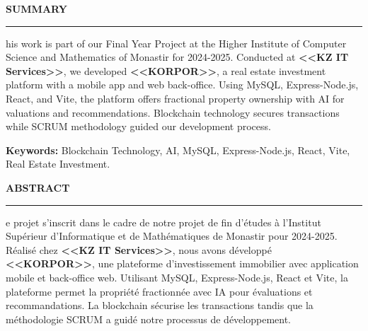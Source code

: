 \thispagestyle{empty} %
\vspace{2.5cm}

\begin{center}
{\color{primary}\Large\textbf{\MakeUppercase{Summary}}}
\end{center}
\vspace{0.1cm}
\begin{center}
\rule{0.6\textwidth}{1pt}
\end{center}
\vspace{0.5cm}

\noindent {}his work is part of our Final Year Project at the Higher Institute of Computer Science and Mathematics of Monastir for 2024-2025. Conducted at \textbf{\textcolor{primary}{<<KZ IT Services>>}}, we developed \textbf{\textcolor{primary}{<<KORPOR>>}}, a real estate investment platform with a mobile app and web back-office. Using MySQL, Express-Node.js, React, and Vite, the platform offers fractional property ownership with AI for valuations and recommendations. Blockchain technology secures transactions while SCRUM methodology guided our development process.

\vspace{0.3cm}
\begin{tcolorbox}[
    colback=background,
    colframe=primary,
    arc=1mm,
    boxrule=0.5pt,
    left=8pt,
    right=8pt,
    top=4pt,
    bottom=4pt,
    width=\textwidth
]
\textbf{Keywords:} Blockchain Technology, AI, MySQL, Express-Node.js, React, Vite, Real Estate Investment.
\end{tcolorbox}

\vspace{3cm} %

\begin{center}
{\color{primary}\Large\textbf{\MakeUppercase{Abstract}}}
\end{center}
\vspace{0.1cm}
\begin{center}
\rule{0.6\textwidth}{1pt}
\end{center}
\vspace{0.5cm}

\noindent {}e projet s'inscrit dans le cadre de notre projet de fin d'études à l'Institut Supérieur d'Informatique et de Mathématiques de Monastir pour 2024-2025. Réalisé chez \textbf{\textcolor{primary}{<<KZ IT Services>>}}, nous avons développé \textbf{\textcolor{primary}{<<KORPOR>>}}, une plateforme d'investissement immobilier avec application mobile et back-office web. Utilisant MySQL, Express-Node.js, React et Vite, la plateforme permet la propriété fractionnée avec IA pour évaluations et recommandations. La blockchain sécurise les transactions tandis que la méthodologie SCRUM a guidé notre processus de développement.

